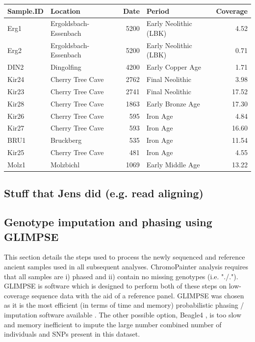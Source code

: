 \begin{tabular}{l|l|r|l|r}
\hline
Sample.ID & Location & Date & Period & Coverage \\
\hline
Erg1 & Ergoldsbach-Essenbach & 5200 & Early Neolithic (LBK) & 4.52\\
\hline
Erg2 & Ergoldsbach-Essenbach & 5200 & Early Neolithic (LBK) & 0.71\\
\hline
DIN2 & Dingolfing & 4200 & Early Copper Age & 1.71\\
\hline
Kir24 & Cherry Tree Cave & 2762 & Final Neolithic & 3.98\\
\hline
Kir23 & Cherry Tree Cave & 2741 & Final Neolithic & 17.52\\
\hline
Kir28 & Cherry Tree Cave & 1863 & Early Bronze Age & 17.30\\
\hline
Kir26 & Cherry Tree Cave & 595 & Iron Age & 4.84\\
\hline
Kir27 & Cherry Tree Cave & 593 & Iron Age & 16.60\\
\hline
BRU1 & Bruckberg & 535 & Iron Age & 11.54\\
\hline
Kir25 & Cherry Tree Cave & 481 & Iron Age & 4.55\\
\hline
Molz1 & Molzbichl & 1069 & Early Middle Age & 13.22\\
\hline
\end{tabular}


\subsection{Stuff that Jens did (e.g. read aligning)}

\subsection{Genotype imputation and phasing using GLIMPSE}
\label{sssec:imputationphasingGLIMPSE}

This section details the steps used to process the newly sequenced and reference ancient samples used in all subsequent analyses. ChromoPainter analysis requires that all samples are i) phased and ii) contain no missing genotypes (i.e. "./."). GLIMPSE \cite{rubinacci2021efficient} is software which is designed to perform both of these steps on low-coverage sequence data with the aid of a reference panel. GLIMPSE was chosen as it is the most efficient (in terms of time and memory) probabilistic phasing / imputation software available \cite{rubinacci2021efficient}. The other possible option, Beagle4 \cite{Browning2007}, is too slow and memory inefficient to impute the large number combined number of individuals and SNPs present in this dataset. 

